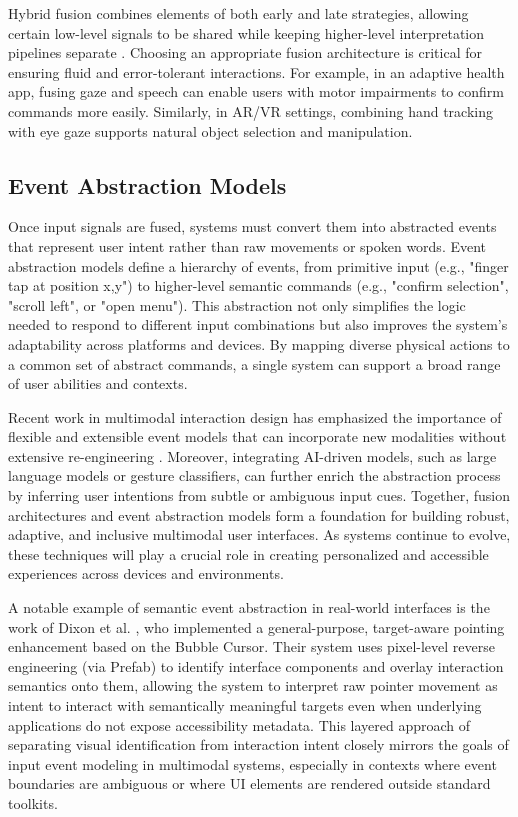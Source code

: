\documentclass[openany]{book}
\begin{document}
Hybrid fusion combines elements of both early and late strategies, allowing certain low-level signals to be shared while keeping higher-level interpretation pipelines separate \cite{Nielsen2021, Oviatt1999}.
Choosing an appropriate fusion architecture is critical for ensuring fluid and error-tolerant interactions. For example, in an adaptive health app, fusing gaze and speech can enable users with motor impairments to confirm commands more easily. Similarly, in AR/VR settings, combining hand tracking with eye gaze supports natural object selection and manipulation.

\subsection{Event Abstraction Models}
Once input signals are fused, systems must convert them into abstracted events that represent user intent rather than raw movements or spoken words. Event abstraction models define a hierarchy of events, from primitive input (e.g., "finger tap at position x,y") to higher-level semantic commands (e.g., "confirm selection", "scroll left", or "open menu").
This abstraction not only simplifies the logic needed to respond to different input combinations but also improves the system’s adaptability across platforms and devices. By mapping diverse physical actions to a common set of abstract commands, a single system can support a broad range of user abilities and contexts.

Recent work in multimodal interaction design has emphasized the importance of flexible and extensible event models that can incorporate new modalities without extensive re-engineering \cite{Bolt1980, Turk2014}. Moreover, integrating AI-driven models, such as large language models or gesture classifiers, can further enrich the abstraction process by inferring user intentions from subtle or ambiguous input cues.
Together, fusion architectures and event abstraction models form a foundation for building robust, adaptive, and inclusive multimodal user interfaces. As systems continue to evolve, these techniques will play a crucial role in creating personalized and accessible experiences across devices and environments.


A notable example of semantic event abstraction in real-world interfaces is the work of Dixon et al. \cite{Dixon}, who implemented a general-purpose, target-aware pointing enhancement based on the Bubble Cursor. Their system uses pixel-level reverse engineering (via Prefab) to identify interface components and overlay interaction semantics onto them, allowing the system to interpret raw pointer movement as intent to interact with semantically meaningful targets even when underlying applications do not expose accessibility metadata. This layered approach of separating visual identification from interaction intent closely mirrors the goals of input event modeling in multimodal systems, especially in contexts where event boundaries are ambiguous or where UI elements are rendered outside standard toolkits.
\end{document}

